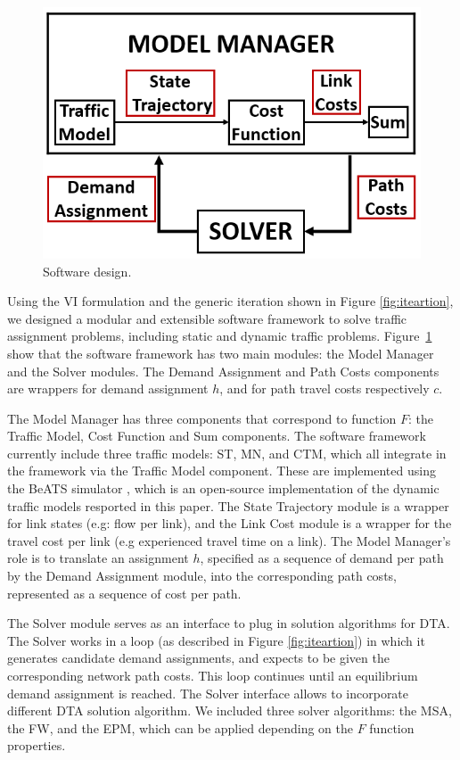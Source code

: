 \begin{figure}[h]
    \centering
    \includegraphics[width=0.7\linewidth]{figs/Software_Block_Diagram.PNG}
    \caption{Software design.}
    \label{fig:Block_Diagram}
\end{figure}

Using the VI formulation and the generic iteration shown in Figure \ref{fig:iteartion}, we designed a modular and extensible software framework to solve traffic assignment problems, including static and dynamic traffic problems. Figure~\ref{fig:Block_Diagram} show that the software framework has two main modules: the Model Manager and the Solver modules. The Demand Assignment and Path Costs components are wrappers for demand assignment $h$, and for path travel costs respectively $c$.

The Model Manager has three components that correspond to function $F$: the Traffic Model, Cost Function and Sum components. The software framework currently include three traffic models: ST, MN, and CTM, which all integrate in the framework via the Traffic Model component. These are implemented using the BeATS simulator \cite{beats}, which is an open-source implementation of the dynamic traffic models resported in this paper.  The State Trajectory module is a wrapper for link states (e.g: flow per link), and the Link Cost module is a wrapper for the travel cost per link (e.g experienced travel time on a link). The Model Manager's role is to translate an assignment $h$, specified as a sequence of demand per path by the Demand Assignment module, into the corresponding path costs, represented as a sequence of cost per path.

The Solver module serves as an interface to plug in solution algorithms for DTA. The Solver works in a loop (as described in Figure \ref{fig:iteartion}) in which it generates candidate demand assignments, and expects to be given the corresponding network path costs. This loop continues until an equilibrium demand assignment is reached. The Solver interface allows to incorporate different DTA solution algorithm. We included three solver algorithms: the MSA, the FW, and the EPM, which can be applied depending on the $F$ function properties. 


